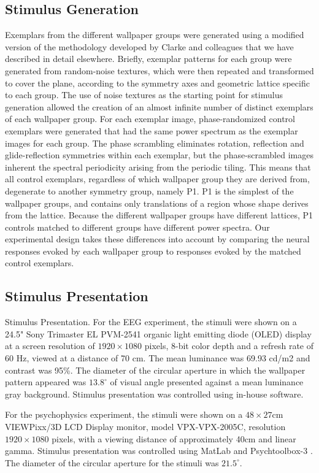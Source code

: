 \documentclass[9pt,twocolumn,twoside,lineno]{pnas-new}
\begin{document}
\subsection*{Stimulus Generation}
Exemplars from the different wallpaper groups were generated using a modified version of the methodology developed by Clarke and colleagues\cite{RN172} that we have described in detail elsewhere\cite{RN1725}. Briefly, exemplar patterns for each group were generated from random-noise textures, which were then repeated and transformed to cover the plane, according to the symmetry axes and geometric lattice specific to each group. The use of noise textures as the starting point for stimulus generation allowed the creation of an almost infinite number of distinct exemplars of each wallpaper group. For each exemplar image, phase-randomized control exemplars were generated that had the same power spectrum as the exemplar images for each group. The phase scrambling eliminates rotation, reflection and glide-reflection symmetries within each exemplar, but the phase-scrambled images inherent the spectral periodicity arising from the periodic tiling. This means that all control exemplars, regardless of which wallpaper group they are derived from, degenerate to another symmetry group, namely P1. P1 is the simplest of the wallpaper groups, and contains only translations of a region whose shape derives from the lattice. Because the different wallpaper groups have different lattices, P1 controls matched to different groups have different power spectra. Our experimental design takes these differences into account by comparing the neural responses evoked by each wallpaper group to responses evoked by the matched control exemplars.

\subsection*{Stimulus Presentation}
Stimulus Presentation. For the EEG experiment, the stimuli were shown on a 24.5" Sony Trimaster EL PVM-2541 organic light emitting diode (OLED) display at a screen resolution of $1920\times1080$ pixels, 8-bit color depth and a refresh rate of 60 Hz, viewed at a distance of 70 cm. The mean luminance was 69.93 cd/m2 and contrast was 95\%. The diameter of the circular aperture in which the wallpaper pattern appeared was $13.8^\circ$ of visual angle presented against a mean luminance gray background. Stimulus presentation was controlled using in-house software.

For the psychophysics experiment, the stimuli were shown on a $48 \times 27$cm VIEWPixx/3D LCD Display monitor, model VPX-VPX-2005C, resolution $1920 \times 1080$ pixels, with a viewing distance of approximately 40cm and linear gamma. Stimulus presentation was controlled using MatLab and Psychtoolbox-3 \cite{kleiner2007,brainard1997spatial}. The diameter of the circular aperture for the stimuli was $21.5^\circ$.
\end{document}
